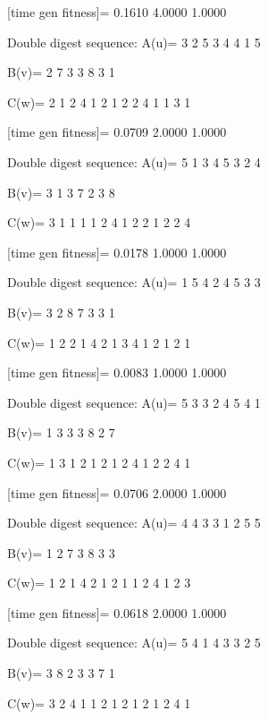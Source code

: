 [time gen fitness]=
    0.1610    4.0000    1.0000

Double digest sequence:
A(u)=
     3     2     5     3     4     4     1     5

B(v)=
     2     7     3     3     8     3     1

C(w)=
     2     1     2     4     1     2     1     2     2     4     1     1     3     1

[time gen fitness]=
    0.0709    2.0000    1.0000

Double digest sequence:
A(u)=
     5     1     3     4     5     3     2     4

B(v)=
     3     1     3     7     2     3     8

C(w)=
     3     1     1     1     1     2     4     1     2     2     1     2     2     4

[time gen fitness]=
    0.0178    1.0000    1.0000

Double digest sequence:
A(u)=
     1     5     4     2     4     5     3     3

B(v)=
     3     2     8     7     3     3     1

C(w)=
     1     2     2     1     4     2     1     3     4     1     2     1     2     1

[time gen fitness]=
    0.0083    1.0000    1.0000

Double digest sequence:
A(u)=
     5     3     3     2     4     5     4     1

B(v)=
     1     3     3     3     8     2     7

C(w)=
     1     3     1     2     1     2     1     2     4     1     2     2     4     1

[time gen fitness]=
    0.0706    2.0000    1.0000

Double digest sequence:
A(u)=
     4     4     3     3     1     2     5     5

B(v)=
     1     2     7     3     8     3     3

C(w)=
     1     2     1     4     2     1     2     1     1     2     4     1     2     3

[time gen fitness]=
    0.0618    2.0000    1.0000

Double digest sequence:
A(u)=
     5     4     1     4     3     3     2     5

B(v)=
     3     8     2     3     3     7     1

C(w)=
     3     2     4     1     1     2     1     2     1     2     1     2     4     1

